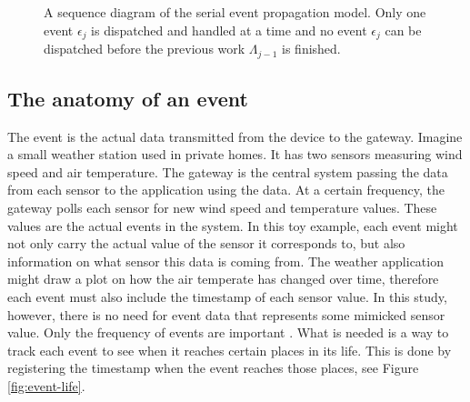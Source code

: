 \begin{figure}[h!]

    \caption[A sequence diagram of the serial event propagation model.]{A
    sequence diagram of the serial event propagation model. Only one event
    $\epsilon_j$ is dispatched and handled at a time and no event $\epsilon_j$
    can be dispatched before the previous work $\Lambda_{j-1}$ is finished.}

    \label{fig:event-propagation-serial}
\end{figure}

\subsection{The anatomy of an event}

The event is the actual data transmitted from the device to the gateway.
Imagine a small weather station used in private homes. It has two sensors
measuring wind speed and air temperature. The gateway is the central system
passing the data from each sensor to the application using the data. At a
certain frequency, the gateway polls each sensor for new wind speed and
temperature values. These values are the actual events in the system. In this
toy example, each event might not only carry the actual value of the sensor it
corresponds to, but also information on what sensor this data is coming from.
The weather application might draw a plot on how the air temperate has changed
over time, therefore each event must also include the timestamp of each sensor
value. In this study, however, there is no need for event data that represents
some mimicked sensor value. Only the frequency of events are important
\cite{weyuker2000experience}. What is needed is a way to track each event to
see when it reaches certain places in its life. This is done by registering the
timestamp when the event reaches those places, see Figure \ref{fig:event-life}.

